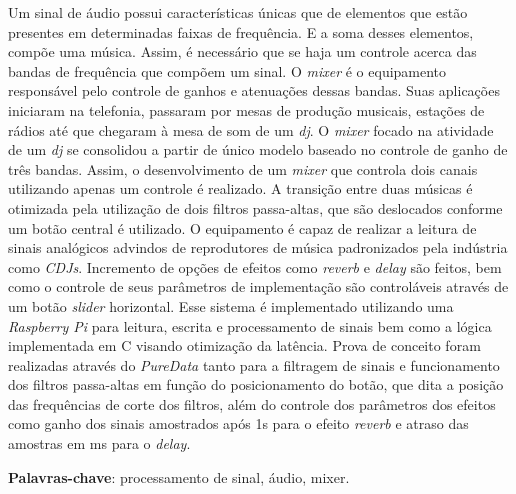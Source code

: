 \begin{resumo}
    Um sinal de áudio possui características únicas que de elementos que estão presentes em determinadas faixas de frequência. E a soma desses elementos, compõe uma música.
    Assim, é necessário que se haja um controle acerca das bandas de frequência que compõem um sinal. O \textit{mixer} é o equipamento responsável pelo controle de ganhos e atenuações dessas bandas. Suas aplicações iniciaram na telefonia, passaram por mesas de produção musicais, estações de rádios até que chegaram à mesa de som de um \textit{dj}. O \textit{mixer} focado na atividade de um \textit{dj} se consolidou a partir de único modelo baseado no controle de ganho de três bandas. Assim, o desenvolvimento de um \textit{mixer} que controla dois canais utilizando apenas um controle é realizado. A transição entre duas músicas é otimizada pela utilização de dois filtros passa-altas, que são deslocados conforme um botão central é utilizado. O equipamento é capaz de realizar a leitura de sinais analógicos advindos de reprodutores de música padronizados pela indústria como \textit{CDJs}. Incremento de opções de efeitos como \textit{reverb} e \textit{delay} são feitos, bem como o controle de seus parâmetros de implementação são controláveis através de um botão \textit{slider} horizontal. Esse sistema é implementado utilizando uma \textit{Raspberry Pi} para leitura, escrita e processamento de sinais bem como a lógica implementada em C visando otimização da latência. Prova de conceito foram realizadas através do \textit{PureData} tanto para a filtragem de sinais e funcionamento dos filtros passa-altas em função do posicionamento do botão, que dita a posição das frequências de corte dos filtros, além do controle dos parâmetros dos efeitos como ganho dos sinais amostrados após 1s para o efeito \textit{reverb} e atraso das amostras em ms para o \textit{delay}.

 \vspace{\onelineskip}
    
 \noindent
 \textbf{Palavras-chave}: processamento de sinal, áudio, mixer.
\end{resumo}
